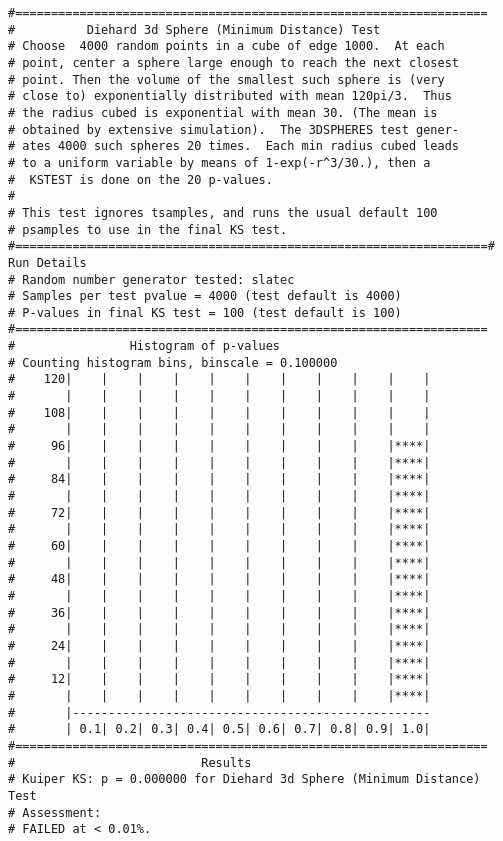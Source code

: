 \documentclass[12pt]{article}
\begin{document}
{\begin{verbatim}
#==================================================================
#          Diehard 3d Sphere (Minimum Distance) Test
# Choose  4000 random points in a cube of edge 1000.  At each   
# point, center a sphere large enough to reach the next closest 
# point. Then the volume of the smallest such sphere is (very   
# close to) exponentially distributed with mean 120pi/3.  Thus  
# the radius cubed is exponential with mean 30. (The mean is    
# obtained by extensive simulation).  The 3DSPHERES test gener- 
# ates 4000 such spheres 20 times.  Each min radius cubed leads 
# to a uniform variable by means of 1-exp(-r^3/30.), then a     
#  KSTEST is done on the 20 p-values.                           
#
# This test ignores tsamples, and runs the usual default 100
# psamples to use in the final KS test.
#==================================================================#                        Run Details
# Random number generator tested: slatec
# Samples per test pvalue = 4000 (test default is 4000)
# P-values in final KS test = 100 (test default is 100)
#==================================================================
#                Histogram of p-values
# Counting histogram bins, binscale = 0.100000
#    120|    |    |    |    |    |    |    |    |    |    |
#       |    |    |    |    |    |    |    |    |    |    |
#    108|    |    |    |    |    |    |    |    |    |    |
#       |    |    |    |    |    |    |    |    |    |    |
#     96|    |    |    |    |    |    |    |    |    |****|
#       |    |    |    |    |    |    |    |    |    |****|
#     84|    |    |    |    |    |    |    |    |    |****|
#       |    |    |    |    |    |    |    |    |    |****|
#     72|    |    |    |    |    |    |    |    |    |****|
#       |    |    |    |    |    |    |    |    |    |****|
#     60|    |    |    |    |    |    |    |    |    |****|
#       |    |    |    |    |    |    |    |    |    |****|
#     48|    |    |    |    |    |    |    |    |    |****|
#       |    |    |    |    |    |    |    |    |    |****|
#     36|    |    |    |    |    |    |    |    |    |****|
#       |    |    |    |    |    |    |    |    |    |****|
#     24|    |    |    |    |    |    |    |    |    |****|
#       |    |    |    |    |    |    |    |    |    |****|
#     12|    |    |    |    |    |    |    |    |    |****|
#       |    |    |    |    |    |    |    |    |    |****|
#       |--------------------------------------------------
#       | 0.1| 0.2| 0.3| 0.4| 0.5| 0.6| 0.7| 0.8| 0.9| 1.0|
#==================================================================
#                          Results
# Kuiper KS: p = 0.000000 for Diehard 3d Sphere (Minimum Distance) Test
# Assessment:
# FAILED at < 0.01%.


\end{verbatim}}
\end{document}
